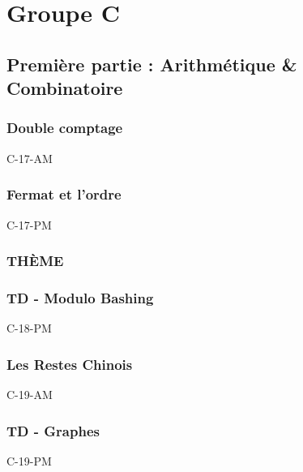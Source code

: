 \documentclass[poly,trombi]{valbonne}
\begin{document}






\chapter{Groupe C}

\minitoc \clearpage

\section{Première partie : Arithmétique \& Combinatoire}

\subsection{Double comptage}

{C-17-AM}

\subsection{Fermat et l'ordre}

{C-17-PM}

\subsection{THÈME}


\subsection{TD - Modulo Bashing}

{C-18-PM}

\subsection{Les Restes Chinois}

{C-19-AM}

\subsection{TD - Graphes}

{C-19-PM}
\end{document}
